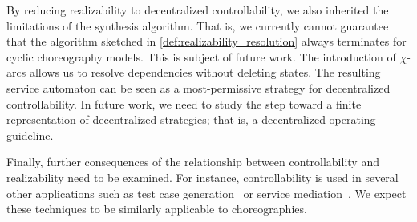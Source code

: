\medskip

By reducing realizability to decentralized controllability, we also inherited the limitations of the synthesis algorithm. That is, we currently cannot guarantee that the algorithm sketched in \autoref{def:realizability_resolution} always terminates for cyclic choreography models. This is subject of future work. The introduction of $\chi$-arcs allows us to resolve dependencies without deleting states. The resulting service automaton can be seen as a most-permissive strategy for decentralized controllability. In future work, we need to study the step toward a finite representation of decentralized strategies; that is, a decentralized operating guideline.

Finally, further consequences of the relationship between controllability and realizability need to be examined. For instance, controllability is used in several other applications such as test case generation~\cite{KaschnerL_2008_wesoa} or service mediation~\cite{GierdsMW_2010_tcs}. We expect these techniques to be similarly applicable to choreographies.

